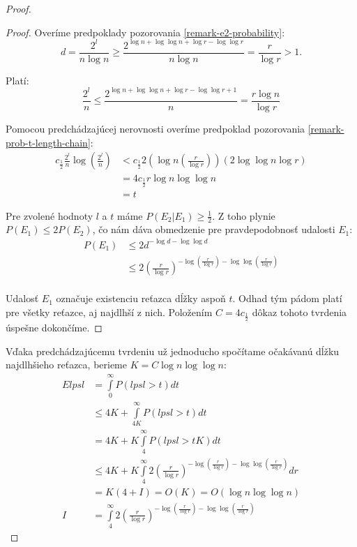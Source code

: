 \begin{proof}
\begin{proof}
Overíme predpoklady pozorovania \ref{remark-e2-probability}:
\begin{displaymath}
d = \frac{2^l}{n \log n} \geq \frac{2^{\log n + \log \log n + \log r - \log \log r}}{n \log n} = \frac{r}{\log r} > 1\textit{.}
\end{displaymath}

Platí:
\begin{displaymath}
\frac{2^l}{n} \leq \frac{2 ^{\log n + \log \log n + \log r - \log \log r + 1}}{n} = \frac{r\log n}{\log r}
\end{displaymath}

Pomocou predchádzajúcej nerovnosti overíme predpoklad pozorovania \ref{remark-prob-t-length-chain}:
\begin{displaymath}
\begin{split}
c_{\frac{1}{2}}\frac{2^l}{n}\log\left(\frac{2^l}{n}\right)
	& < c_{\frac{1}{2}} 2 \left(\log n \left(\frac{r}{\log r}\right)\right)\left(2\log\log n \log r\right) \\
	& = 4 c_{\frac{1}{2}} r \log n \log \log n \\
	& = t
\end{split}
\end{displaymath}

Pre zvolené hodnoty $l$ a $t$ máme $P(E_2 | E_1) \geq \frac{1}{2}$. Z toho plynie $P(E_1) \leq 2 P(E_2)$, čo nám dáva obmedzenie pre pravdepodobnosť udalosti $E_1$:
\begin{displaymath}
\begin{split}
P(E_1) 
	& \leq 2d^{-\log d - \log \log d} \\
	& \leq 2\left(\frac{r}{\log r}\right)^{-\log \left(\frac{r}{\log r}\right) - \log \log \left(\frac{r}{\log r}\right)} \\
\end{split}
\end{displaymath}

Udalosť $E_1$ označuje existenciu reťazca dĺžky aspoň $t$. Odhad tým pádom platí pre všetky reťazce, aj najdlhší z nich. Položením $C = 4c_{\frac{1}{2}}$ dôkaz tohoto tvrdenia úspešne dokončíme.
\end{proof}

Vďaka predchádzajúcemu tvrdeniu už jednoducho spočítame očakávanú dĺžku najdlhšieho reťazca, berieme $K = C\log n \log \log n$:
\begin{displaymath}
\begin{split}
E lpsl 
	& = \int\limits_0^{\infty} P(lpsl > t) dt \\
	& \leq 4K + \int\limits_{4K}^\infty P(lpsl > t) dt \\
	& = 4K + K \int\limits_4^\infty P(lpsl > tK) dt \\
	& \leq 4K + K \int\limits_4^\infty 2 \left(\frac{r}{\log r}\right)^{-\log \left(\frac{r}{\log r}\right) - \log \log \left(\frac{r}{\log r}\right)} dr \\
	& = K(4 + I) = O(K) = O(\log n \log \log n) \\
I 	& = \int\limits_4^\infty 2 \left(\frac{r}{\log r}\right)^{-\log \left(\frac{r}{\log r}\right) - \log \log \left(\frac{r}{\log r}\right)}
\end{split}
\end{displaymath}


\end{proof}
